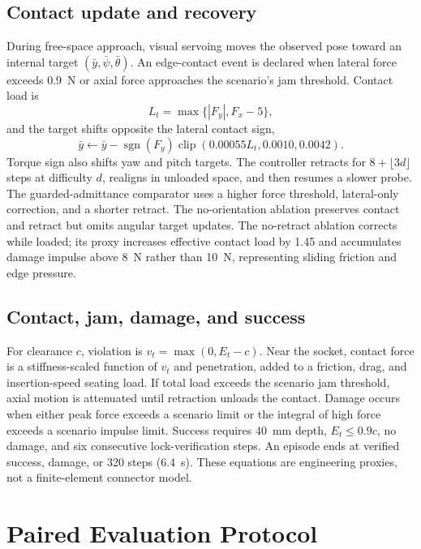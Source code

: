 \documentclass[journal]{IEEEtran}
\begin{document}
\subsection{Contact update and recovery}

During free-space approach, visual servoing moves the observed pose toward an
internal target $(\bar y,\bar\psi,\bar\theta)$.  An edge-contact event is declared
when lateral force exceeds 0.9~N or axial force approaches the scenario's jam
threshold.  Contact load is
\begin{equation}
  L_t=\max\{|F_y|,F_x-5\},
\end{equation}
and the target shifts opposite the lateral contact sign,
\begin{equation}
  \bar y\leftarrow \bar y-\operatorname{sgn}(F_y)
  \operatorname{clip}(0.00055L_t,0.0010,0.0042).
\end{equation}
Torque sign also shifts yaw and pitch targets.  The controller retracts for
$8+\lfloor3d\rfloor$ steps at difficulty $d$, realigns in unloaded space, and
then resumes a slower probe.  The guarded-admittance comparator uses a higher
force threshold, lateral-only correction, and a shorter retract.  The
no-orientation ablation preserves contact and retract but omits angular target
updates.  The no-retract ablation corrects while loaded; its proxy increases
effective contact load by 1.45 and accumulates damage impulse above 8~N rather
than 10~N, representing sliding friction and edge pressure.

\subsection{Contact, jam, damage, and success}

For clearance $c$, violation is $v_t=\max(0,E_t-c)$.  Near the socket, contact
force is a stiffness-scaled function of $v_t$ and penetration, added to a
friction, drag, and insertion-speed seating load.  If total load exceeds the
scenario jam threshold, axial motion is attenuated until retraction unloads the
contact.  Damage occurs when either peak force exceeds a scenario limit or the
integral of high force exceeds a scenario impulse limit.  Success requires
40~mm depth, $E_t\leq0.9c$, no damage, and six consecutive lock-verification
steps.  An episode ends at verified success, damage, or 320 steps (6.4~s).
These equations are engineering proxies, not a finite-element connector model.

\section{Paired Evaluation Protocol}
\end{document}
